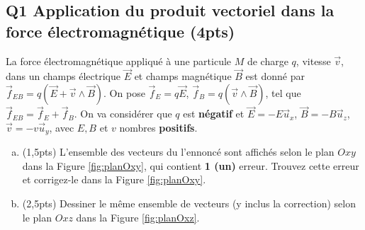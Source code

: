 \documentclass[french,10pt,twocolumn]{article}
\begin{document}
	\FloatBarrier
	
	\subsection*{Q1 Application du produit vectoriel dans la force électromagnétique (4pts)}
	La force électromagnétique appliqué à une particule $M$ de charge $q$, vitesse $\vec{v}$, dans un champs électrique $\vec{E}$ et champs magnétique $\vec{B}$ est donné par $\vec{f}_{EB} = q (\vec{E} + \vec{v} \wedge \vec{B})$. On pose $\vec{f}_E = q \vec{E}$, $\vec{f}_B =   q  (\vec{v} \wedge \vec{B})$, tel que $\vec{f}_{EB} = \vec{f}_E + \vec{f}_B$. On va considérer que $q$ est \textbf{négatif} et $\vec{E} = -E \vec{u}_x$, $\vec{B} = - B \vec{u}_z$, $\vec{v} = -v \vec{u}_y$, avec $E, B$ et $v$ nombres \textbf{positifs}.
	\begin{enumerate}[a)]
		\item(1,5pts) L'ensemble des vecteurs du l'ennoncé sont affichés selon le plan $Oxy$ dans la Figure \ref{fig:planOxy}, qui contient {\bf 1 (un)} erreur. Trouvez cette erreur et corrigez-le dans la Figure \ref{fig:planOxy}.  
		\item(2,5pts) Dessiner le même ensemble de vecteurs (y inclus la correction) selon le plan $Oxz$ dans la Figure \ref{fig:planOxz}.
	\end{enumerate}
	
\end{document}
